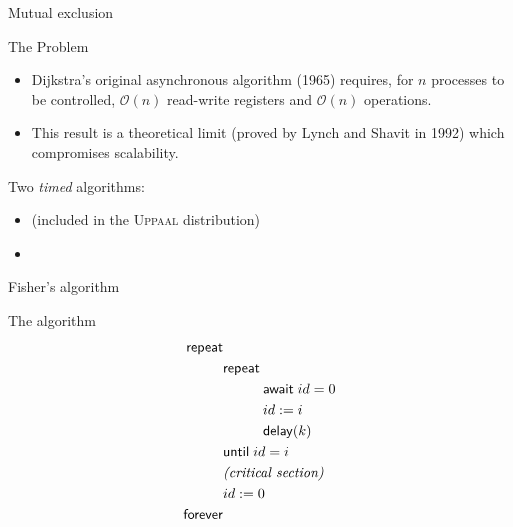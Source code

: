 \documentclass[aspectratio=169]{beamer}
\begin{document}
\begin{slide}{Mutual exclusion}
\small


\begin{block}{The Problem}
\begin{itemize}
\item 
Dijkstra's original asynchronous algorithm (1965) requires, for $n$ processes to be controlled,
$\mathcal{O}(n)$ read-write registers and $\mathcal{O}(n)$ operations.
\item
This result is a theoretical limit (proved by Lynch and Shavit in 1992) which compromises scalability.
\end{itemize}
\end{block}
\pause
{}

\begin{block}{Two \emph{timed} algorithms:}
\begin{itemize}
\item  {} (included in the \textsc{Uppaal} distribution)
\item  {}
\end{itemize}
\end{block}
\end{slide}


\begin{slide}{Fisher's algorithm}
\small

\begin{block}{The algorithm}
\begin{align*}
\mathsf{repeat} & \\
& \mathsf{repeat}  \\
&  \hspace{1cm} \mathsf{await} \; id = 0\\
& \hspace{1cm} id := i\\
& \hspace{1cm}  \mathsf{delay}(k)\\ 
& \mathsf{until}\; id=i  \\
& \text{\emph{(critical section)}}\\
& id := 0\\
\mathsf{forever} &
\end{align*}
\end{block}
\end{slide}
\end{document}
